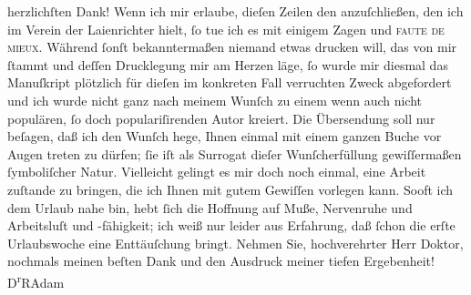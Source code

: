 \begin{ledgroupsized}[t]{13cm}
                    herzlichſten Dank!\pend
           \pstart
           Wenn ich mir erlaube, dieſen Zeilen den \label{K_L02514_1v}\label{K_L02514_1h} anzuſchließen, den ich im Verein der Laienrichter hielt, ſo tue ich es mit einigem
                    Zagen und \textsc{faute de mieux}. Während ſonſt bekanntermaßen
                    niemand etwas drucken will, das von mir ſtammt und deſſen Drucklegung mir am
                    Herzen läge, ſo wurde mir diesmal das Manuſkript plötzlich für dieſen im
                    konkreten Fall verruchten Zweck abgefordert und ich wurde nicht ganz nach meinem
                    Wunſch zu einem wenn auch nicht populären, ſo doch populariſirenden Autor
                    kreiert. Die Übersendung soll nur beſagen, daß ich den Wunſch hege, Ihnen einmal
                    mit einem ganzen Buche {\pb}vor Augen
                    treten zu dürfen; ſie iſt als Surrogat dieſer Wunſcherfüllung gewiſſermaßen
                    ſymboliſcher Natur.\pend
           \pstart
           Vielleicht gelingt es mir doch noch einmal, eine Arbeit zuſtande zu bringen, die
                    ich Ihnen mit gutem Gewiſſen vorlegen kann. Sooft ich dem Urlaub nahe bin, hebt
                    ſich die Hoffnung auf Muße, Nervenruhe und Arbeitsluſt und -fähigkeit; ich weiß
                    nur leider aus Erfahrung, daß ſchon die erſte Urlaubswoche eine Enttäuſchung
                    bringt.\pend
           \pstart
           Nehmen Sie, hochverehrter Herr Doktor, nochmals meinen beſten Dank und den
                    Ausdruck meiner tiefen Ergebenheit!\pend
           \pstart \spacefill\mbox{D\textsuperscript{r}RAdam}\pend{}
         
         \endnumbering{}\end{ledgroupsized}  \newcommand{\dateiname}{L02514}\newcommand{\titel}{Robert Adam an Arthur Schnitzler, 22. 7. 1929}\newcommand{\editorInnen}{Martin Anton Müller und Gerd-Hermann Susen}
      